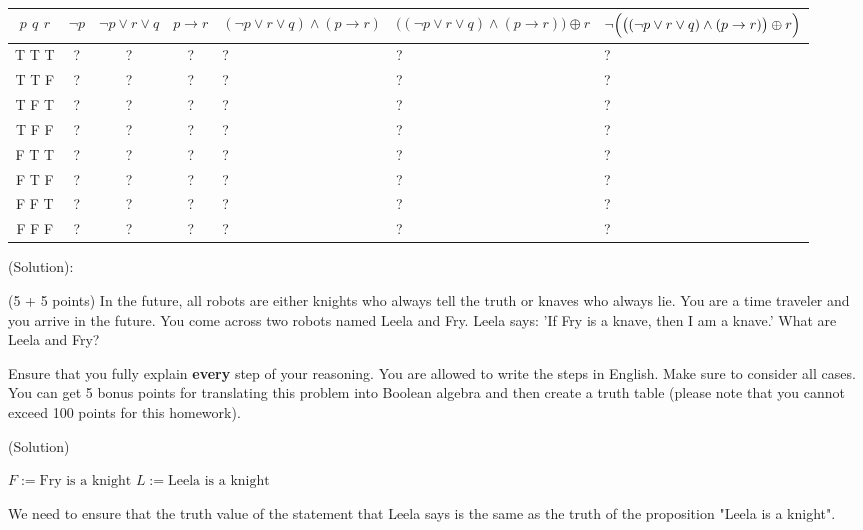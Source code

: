 \documentclass[letterpaper,12pt]{article}
\theoremstyle{plain}
\theoremstyle{definition}
\theoremstyle{remark}
\providecommand{\land}{\ensuremath{\wedge}}
\providecommand{\lor}{\ensuremath{\vee}}
\providecommand{\lxor}{\ensuremath{\oplus}}
\begin{document}
\begin{enumerate}
\begin{center}
\begin{tabular}{ | c | c | c | c | m{2.1cm} | m{2.6cm} | m{2.8cm} |} 
  \hline
 $p$ $q$ $r$ & $\lnot p$ & $\lnot p \lor r \lor q$ & $p \to r$ & $(\lnot p \lor r \lor q) \land (p \to r)$ & $((\lnot p \lor r \lor q) \land (p \to r)\bigr) \lxor r$ & $\lnot\Bigl( \bigl((\lnot p \lor r \lor q) \land (p \to r)\bigr) \lxor r\Bigr)$\\
  \hline
  T T T & ? & ? & ? & ? & ? & ?\\ 
  T T F & ? & ? & ? & ? & ? & ?\\ 
  T F T & ? & ? & ? & ? & ? & ?\\
  T F F & ? & ? & ? & ? & ? & ?\\
  F T T & ? & ? & ? & ? & ? & ?\\
  F T F & ? & ? & ? & ? & ? & ?\\
  F F T & ? & ? & ? & ? & ? & ?\\
  F F F & ? & ? & ? & ? & ? & ?\\
  \hline
\end{tabular}
\end{center}
  \end{enumerate}

(Solution): %

\item (5 + 5 points)
In the future, all robots are either knights who always tell the truth or knaves who always lie. You are a time traveler and you arrive in the future. You come across two robots named %
Leela and Fry. Leela says: 'If Fry is a knave, then I am a knave.' What are Leela and Fry?

  Ensure that you fully explain \textbf{every} step of your reasoning. You are allowed to write the steps in English. Make sure to consider all cases. 
  You can get 5 bonus points for translating this problem into Boolean algebra and then create a truth table (please note that you cannot exceed 100 points for this homework).
  
(Solution)

$F:=\text{Fry is a knight}$
\newline
$L:=\text{Leela is a knight}$
\newline

We need to ensure that the truth value of the statement that Leela says is the same as the truth of the proposition "Leela is a knight".
\end{document}
